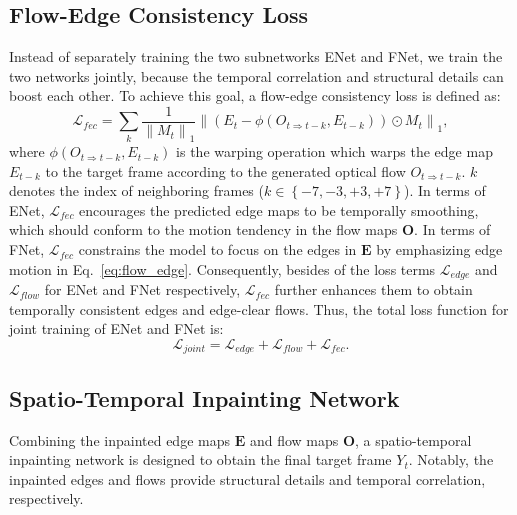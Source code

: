 \subsection{Flow-Edge Consistency Loss}


Instead of separately training the two subnetworks ENet and FNet, we train the two networks jointly, because the temporal correlation and structural details can boost each other.
To achieve this goal, a flow-edge consistency loss is defined as:
%
\begin{equation}
\label{eq:flow_edge}
\mathcal{L}_{fec}=\sum_{k}\frac{1}{\left\|M_{t} \right\|_1}\left\|(E_{t}-\phi(O_{t\Rightarrow t-k},E_{t-k}))\odot M_{t}\right\|_1,
\end{equation}
where $\phi(O_{t\Rightarrow t-k},E_{t-k})$ is the warping operation which warps the edge map $E_{t-k}$ to the target frame according to the generated optical flow $O_{t\Rightarrow t-k}$.
$k$ denotes the index of neighboring frames ($k\in \left\{-7,-3,+3,+7 \right\}$). 
In terms of ENet, $\mathcal{L}_{fec}$ encourages the predicted edge maps to be temporally smoothing, which should conform to the motion tendency in the flow maps $\boldsymbol{O}$. 
In terms of FNet, $\mathcal{L}_{fec}$ constrains the model to focus on the edges in $\boldsymbol{E}$ by emphasizing edge motion in Eq.~\ref{eq:flow_edge}. 
Consequently, besides of the loss terms $\mathcal{L}_{edge}$ and $\mathcal{L}_{flow}$ for ENet and FNet respectively, $\mathcal{L}_{fec}$ further enhances them to obtain temporally consistent edges and edge-clear flows.
Thus, the total loss function for joint training of ENet and FNet is:
\begin{equation}
\label{eq:flow}
\mathcal{L}_{joint}=\mathcal{L}_{edge}+\mathcal{L}_{flow}+ \mathcal{L}_{fec}.
\end{equation}






\subsection{Spatio-Temporal Inpainting Network}

Combining the inpainted edge maps $\boldsymbol{E}$ and flow maps $\boldsymbol{O}$, a spatio-temporal inpainting network  is designed to obtain the final target frame $Y_t$.
Notably, the inpainted edges and flows provide structural details and temporal correlation, respectively. 





